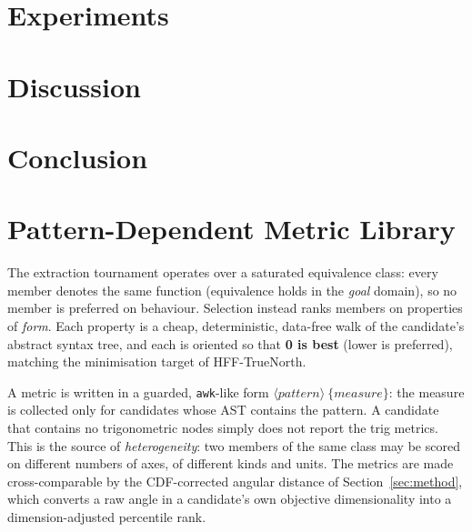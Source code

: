 \documentclass[sigconf]{acmart}
\begin{document}
\section{Experiments}
\label{sec:experiments}

\section{Discussion}
\label{sec:discussion}

\section{Conclusion}
\label{sec:conclusion}

\appendix

\section{Pattern-Dependent Metric Library}
\label{app:metrics}

The extraction tournament operates over a saturated equivalence class: every
member denotes the same function (equivalence holds in the \emph{goal} domain),
so no member is preferred on behaviour. Selection instead ranks members on
properties of \emph{form}. Each property is a cheap, deterministic, data-free
walk of the candidate's abstract syntax tree, and each is oriented so that
\textbf{0 is best} (lower is preferred), matching the minimisation target of
HFF-TrueNorth.

A metric is written in a guarded, \texttt{awk}-like form
\(\langle\textit{pattern}\rangle\ \{\textit{measure}\}\): the measure is
collected only for candidates whose AST contains the pattern. A candidate that
contains no trigonometric nodes simply does not report the trig metrics. This is
the source of \emph{heterogeneity}: two members of the same class may be scored
on different numbers of axes, of different kinds and units. The metrics are made
cross-comparable by the CDF-corrected angular distance of
Section~\ref{sec:method}, which converts a raw angle in a candidate's own
objective dimensionality into a dimension-adjusted percentile rank.
\end{document}
